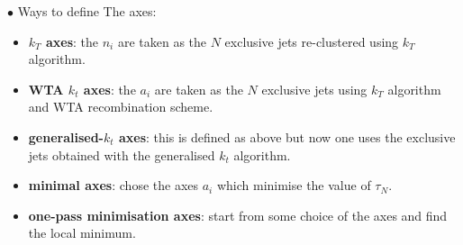 \documentclass[9pt,a4paper,unknownkeysallowed,xcolor=dvipsnames,aspectratio=43]{beamer}
\begin{document}
%
%
\begin{frame}
\vspace{2mm}

{\color{darkred}\Large$\bullet$} Ways to define The axes:\vspace{4mm}
\begin{itemize}
\item[\diamondsuit] {\bf $k_T$ axes}: the $n_i$ are taken as the $N$ exclusive jets re-clustered using $k_T$ algorithm.\vspace{4mm}
\item[\diamondsuit] {\bf WTA $k_t$ axes}: the $a_i$
  are taken as the $N$ exclusive jets using $k_T$ algorithm and WTA recombination scheme.\vspace{4mm}
\item[\diamondsuit] {\bf generalised-$k_t$ axes}: this is defined as above but now
  one uses the exclusive jets obtained with the generalised $k_t$
  algorithm.\vspace{4mm}
\item[\diamondsuit] {\bf minimal axes}: chose the axes $a_i$ which minimise the
  value of $\tau_N$.\vspace{4mm}
\item[\diamondsuit] {\bf one-pass minimisation axes}: start from some choice of the axes and find the local minimum.
\end{itemize}

\end{frame}
\end{document}
